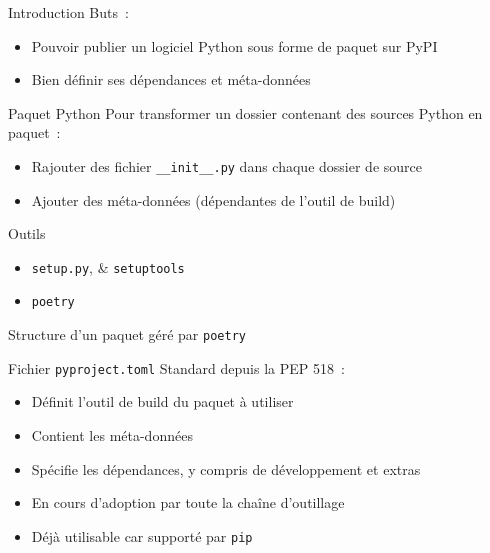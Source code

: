 \begin{frame}{Introduction}
  Buts~:
  \begin{itemize}[<+->]
    \item Pouvoir publier un logiciel Python sous forme de paquet sur PyPI
    \item Bien définir ses dépendances et méta-données
  \end{itemize}
\end{frame}

\begin{frame}{Paquet Python}
  Pour transformer un dossier contenant des sources Python en paquet~:

  \begin{itemize}[<+->]
    \item Rajouter des fichier \texttt{\_\_init\_\_.py} dans chaque dossier de source
    \item Ajouter des méta-données (dépendantes de l'outil de build)
  \end{itemize}
\end{frame}

\begin{frame}{Outils}

  \begin{itemize}[<+->]
    \item \texttt{setup.py}, \& \texttt{setuptools}
    \item \texttt{poetry}
  \end{itemize}

\end{frame}

\begin{frame}{Structure d'un paquet géré par \texttt{poetry}}
\end{frame}

\begin{frame}{Fichier \texttt{pyproject.toml}}
  Standard depuis la PEP 518~:

  \begin{itemize}[<+->]
    \item Définit l'outil de build du paquet à utiliser
    \item Contient les méta-données
    \item Spécifie les dépendances, y compris de développement et extras
    \item En cours d'adoption par toute la chaîne d'outillage
    \item Déjà utilisable car supporté par \texttt{pip}
  \end{itemize}
\end{frame}

